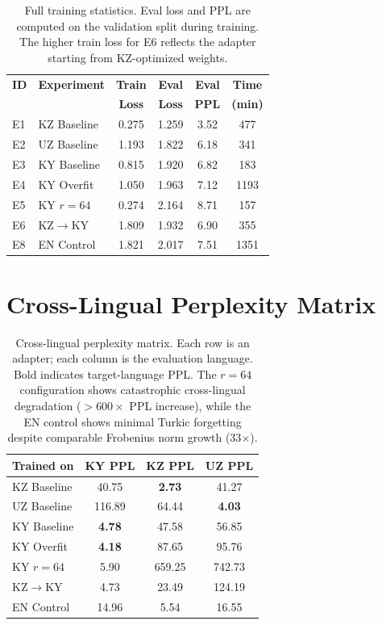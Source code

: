 \documentclass[11pt]{article}
\begin{document}
\begin{table}[H]
\centering
\scriptsize
\begin{tabular}{llcccc}
\toprule
\textbf{ID} & \textbf{Experiment} & \textbf{Train} & \textbf{Eval} & \textbf{Eval} & \textbf{Time} \\
 & & \textbf{Loss} & \textbf{Loss} & \textbf{PPL} & \textbf{(min)} \\
\midrule
E1 & KZ Baseline & 0.275 & 1.259 & 3.52 & 477 \\
E2 & UZ Baseline & 1.193 & 1.822 & 6.18 & 341 \\
E3 & KY Baseline & 0.815 & 1.920 & 6.82 & 183 \\
E4 & KY Overfit & 1.050 & 1.963 & 7.12 & 1193 \\
E5 & KY $r{=}64$ & 0.274 & 2.164 & 8.71 & 157 \\
E6 & KZ$\rightarrow$KY & 1.809 & 1.932 & 6.90 & 355 \\
E8 & EN Control & 1.821 & 2.017 & 7.51 & 1351 \\
\bottomrule
\end{tabular}
\caption{Full training statistics. Eval loss and PPL are computed on the validation split during training. The higher train loss for E6 reflects the adapter starting from KZ-optimized weights.}
\label{tab:training_details}
\end{table}

\section{Cross-Lingual Perplexity Matrix}
\label{app:cross_ppl}

\begin{table}[H]
\centering
\small
\begin{tabular}{lccc}
\toprule
\textbf{Trained on} & \textbf{KY PPL} & \textbf{KZ PPL} & \textbf{UZ PPL} \\
\midrule
KZ Baseline & 40.75 & \textbf{2.73} & 41.27 \\
UZ Baseline & 116.89 & 64.44 & \textbf{4.03} \\
KY Baseline & \textbf{4.78} & 47.58 & 56.85 \\
KY Overfit & \textbf{4.18} & 87.65 & 95.76 \\
KY $r{=}64$ & 5.90 & 659.25 & 742.73 \\
KZ$\rightarrow$KY & 4.73 & 23.49 & 124.19 \\
\midrule
EN Control & 14.96 & 5.54 & 16.55 \\
\bottomrule
\end{tabular}
\caption{Cross-lingual perplexity matrix. Each row is an adapter; each column is the evaluation language. Bold indicates target-language PPL. The $r{=}64$ configuration shows catastrophic cross-lingual degradation ($>600\times$ PPL increase), while the EN control shows minimal Turkic forgetting despite comparable Frobenius norm growth (33$\times$).}
\label{tab:cross_ppl}
\end{table}
\end{document}
